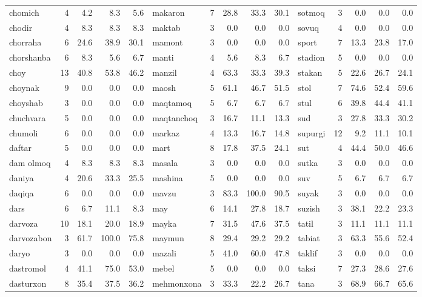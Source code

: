 \documentclass[a4paper,10pt]{article}
\begin{document}
\begin{longtable}{lrrrr|lrrrr|lrrrr}
cho\textquotesingle{}mich & 4 & 4.2 & 8.3 & 5.6 & makaron & 7 & 28.8 & 33.3 & 30.1 & sotmoq & 3 & 0.0 & 0.0 & 0.0 \\
chodir & 4 & 8.3 & 8.3 & 8.3 & maktab & 3 & 0.0 & 0.0 & 0.0 & sovuq & 4 & 0.0 & 0.0 & 0.0 \\
chorraha & 6 & 24.6 & 38.9 & 30.1 & mamont & 3 & 0.0 & 0.0 & 0.0 & sport & 7 & 13.3 & 23.8 & 17.0 \\
chorshanba & 6 & 8.3 & 5.6 & 6.7 & manti & 4 & 5.6 & 8.3 & 6.7 & stadion & 5 & 0.0 & 0.0 & 0.0 \\
choy & 13 & 40.8 & 53.8 & 46.2 & manzil & 4 & 63.3 & 33.3 & 39.3 & stakan & 5 & 22.6 & 26.7 & 24.1 \\
choynak & 9 & 0.0 & 0.0 & 0.0 & maosh & 5 & 61.1 & 46.7 & 51.5 & stol & 7 & 74.6 & 52.4 & 59.6 \\
choyshab & 3 & 0.0 & 0.0 & 0.0 & maqtamoq & 5 & 6.7 & 6.7 & 6.7 & stul & 6 & 39.8 & 44.4 & 41.1 \\
chuchvara & 5 & 0.0 & 0.0 & 0.0 & maqtanchoq & 3 & 16.7 & 11.1 & 13.3 & sud & 3 & 27.8 & 33.3 & 30.2 \\
chumoli & 6 & 0.0 & 0.0 & 0.0 & markaz & 4 & 13.3 & 16.7 & 14.8 & supurgi & 12 & 9.2 & 11.1 & 10.1 \\
daftar & 5 & 0.0 & 0.0 & 0.0 & mart & 8 & 17.8 & 37.5 & 24.1 & sut & 4 & 44.4 & 50.0 & 46.6 \\
dam olmoq & 4 & 8.3 & 8.3 & 8.3 & masala & 3 & 0.0 & 0.0 & 0.0 & sutka & 3 & 0.0 & 0.0 & 0.0 \\
daniya & 4 & 20.6 & 33.3 & 25.5 & mashina & 5 & 0.0 & 0.0 & 0.0 & suv & 5 & 6.7 & 6.7 & 6.7 \\
daqiqa & 6 & 0.0 & 0.0 & 0.0 & mavzu & 3 & 83.3 & 100.0 & 90.5 & suyak & 3 & 0.0 & 0.0 & 0.0 \\
dars & 6 & 6.7 & 11.1 & 8.3 & may & 6 & 14.1 & 27.8 & 18.7 & suzish & 3 & 38.1 & 22.2 & 23.3 \\
darvoza & 10 & 18.1 & 20.0 & 18.9 & mayka & 7 & 31.5 & 47.6 & 37.5 & ta\textquotesingle{}til & 3 & 11.1 & 11.1 & 11.1 \\
darvozabon & 3 & 61.7 & 100.0 & 75.8 & maymun & 8 & 29.4 & 29.2 & 29.2 & tabiat & 3 & 63.3 & 55.6 & 52.4 \\
daryo & 3 & 0.0 & 0.0 & 0.0 & mazali & 5 & 41.0 & 60.0 & 47.8 & taklif & 3 & 0.0 & 0.0 & 0.0 \\
dastro\textquotesingle{}mol & 4 & 41.1 & 75.0 & 53.0 & mebel & 5 & 0.0 & 0.0 & 0.0 & taksi & 7 & 27.3 & 28.6 & 27.6 \\
dasturxon & 8 & 35.4 & 37.5 & 36.2 & mehmonxona & 3 & 33.3 & 22.2 & 26.7 & tana & 3 & 68.9 & 66.7 & 65.6 \\

\end{longtable}
\end{document}
